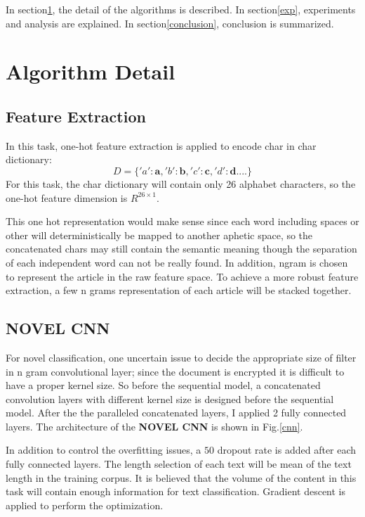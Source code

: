 \documentclass[a4paper]{article}
\begin{document}
In section\ref{algoDetail}, the detail of the algorithms is described. In section\ref{exp}, experiments and analysis are explained. In section\ref{conclusion}, conclusion is summarized.

\section{Algorithm Detail}\label{algoDetail}

\subsection{Feature Extraction}
In this task, one-hot feature extraction is applied to encode char in char dictionary:
\begin{equation}
D = \{'a': \mathbf{a},'b': \mathbf{b},'c': \mathbf{c},'d': \mathbf{d}....\}
\end{equation}
For this task, the char dictionary will contain only 26 alphabet characters, so the one-hot feature dimension is $R^{26 \times 1}$.

This one hot representation would make sense since each word including spaces or other will deterministically be mapped to another aphetic space, so the concatenated chars may still contain the semantic meaning though the separation of each independent word can not be really found. In addition, ngram is chosen to represent the article in the raw feature space. To achieve a more robust feature extraction, a few n grams representation of each article will be stacked together.

\subsection{NOVEL CNN}
For novel classification, one uncertain issue to decide the appropriate size of filter in n gram convolutional layer; since the document is encrypted it is difficult to have a proper kernel size. So before the sequential model, a concatenated convolution layers with different kernel size is designed before the sequential model. After the the paralleled concatenated layers, I applied 2 fully connected layers. The architecture of the \textbf{NOVEL CNN} is shown in Fig.\ref{cnn}.

In addition to control the overfitting issues, a $50$ dropout rate is added after each fully connected layers. The length selection of each text will be mean of the text length in the training corpus. It is believed that the volume of the content in this task will contain enough information for text classification. Gradient descent is applied to perform the optimization.
\end{document}
